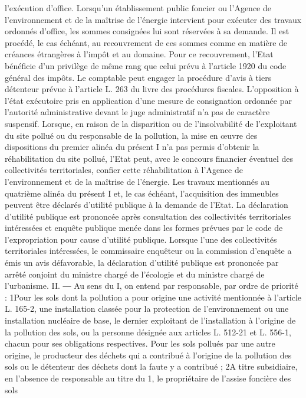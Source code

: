 \documentclass[11pt,a4paper]{report}
\begin{document}
	l'exécution d'office. Lorsqu'un établissement public foncier ou l'Agence de l'environnement et de la maîtrise de
	l'énergie intervient pour exécuter des travaux ordonnés d'office, les sommes consignées lui sont réservées à sa
	demande.
	Il est procédé, le cas échéant, au recouvrement de ces sommes comme en matière de créances étrangères à
	l'impôt et au domaine. Pour ce recouvrement, l'Etat bénéficie d'un privilège de même rang que celui prévu à
	l'article 1920 du code général des impôts. Le comptable peut engager la procédure d'avis à tiers détenteur
	prévue à l'article L. 263 du livre des procédures fiscales.
	L'opposition à l'état exécutoire pris en application d'une mesure de consignation ordonnée par l'autorité
	administrative devant le juge administratif n'a pas de caractère suspensif.
	Lorsque, en raison de la disparition ou de l'insolvabilité de l'exploitant du site pollué ou du responsable de la
	pollution, la mise en œuvre des dispositions du premier alinéa du présent I n'a pas permis d'obtenir la
	réhabilitation du site pollué, l'Etat peut, avec le concours financier éventuel des collectivités territoriales,
	confier cette réhabilitation à l'Agence de l'environnement et de la maîtrise de l'énergie.
	Les travaux mentionnés au quatrième alinéa du présent I et, le cas échéant, l'acquisition des immeubles peuvent
	être déclarés d'utilité publique à la demande de l'Etat. La déclaration d'utilité publique est prononcée après
	consultation des collectivités territoriales intéressées et enquête publique menée dans les formes prévues par le
	code de l'expropriation pour cause d'utilité publique. Lorsque l'une des collectivités territoriales intéressées, le
	commissaire enquêteur ou la commission d'enquête a émis un avis défavorable, la déclaration d'utilité publique
	est prononcée par arrêté conjoint du ministre chargé de l'écologie et du ministre chargé de l'urbanisme.
	II. ― Au sens du I, on entend par responsable, par ordre de priorité :
	1\degre  Pour les sols dont la pollution a pour origine une activité mentionnée à l'article L. 165-2, une installation
	classée pour la protection de l'environnement ou une installation nucléaire de base, le dernier exploitant de
	l'installation à l'origine de la pollution des sols, ou la personne désignée aux articles L. 512-21 et L. 556-1,
	chacun pour ses obligations respectives. Pour les sols pollués par une autre origine, le producteur des déchets
	qui a contribué à l'origine de la pollution des sols ou le détenteur des déchets dont la faute y a contribué ;
	2\degre  A titre subsidiaire, en l'absence de responsable au titre du 1\degre , le propriétaire de l'assise foncière des sols
\end{document}

